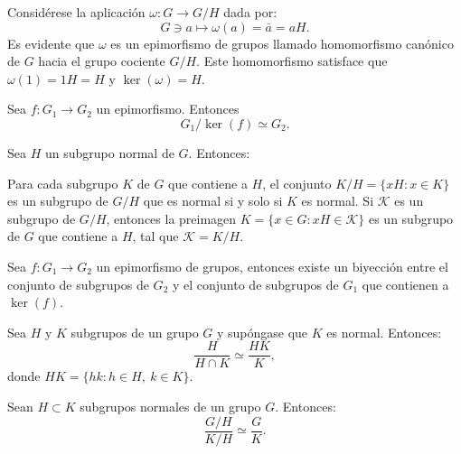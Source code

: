 Considérese la aplicación $\omega \colon G \to G/H$ dada por: \[G \ni a \mapsto \omega(a) = 	\bar{a} = aH. \]
\indent Es evidente que $\omega$ es un epimorfismo de grupos llamado homomorfismo canónico de $G$ hacia el grupo cociente $G/H$. Este homomorfismo satisface que $\omega(1) = 1H = H$ y $\ker(\omega) = H.$ 
\begin{corolario}
Sea $f \colon G_1 \to G_2$ un epimorfismo. Entonces \[ G_1/\ker(f) \simeq G_2. \]
\end{corolario}
\newpage
\begin{lema}
Sea $H$ un subgrupo normal de $G$. Entonces:
\begin{bulletList}
\newItem Para cada subgrupo $K$ de $G$ que contiene a $H$, el conjunto $K/H = \{ xH \colon x \in K \}$ es un subgrupo de $G/H$ que es normal si y solo si $K$ es normal.
\newItem Si $\mathcal{K}$ es un subgrupo de $G/H$, entonces la preimagen $K = \{ x \in G \colon xH \in \mathcal{K} \}$ es un subgrupo de $G$ que contiene a $H$, tal que $\mathcal{K} = K/H$.
\end{bulletList}
\end{lema}
\begin{teorema}
Sea $f \colon G_1 \to G_2$ un epimorfismo de grupos, entonces existe un biyección entre el conjunto de subgrupos de $G_2$ y el conjunto de subgrupos de $G_1$ que contienen a $\ker(f)$.
\end{teorema}
\begin{teorema}
Sea $H$ y $K$ subgrupos de un grupo $G$ y supóngase que $K$ es normal. Entonces: \[ \frac{H}{H \cap K} \simeq \frac{HK}{K}, \] donde $HK = \{ hk \colon h \in H, \ k \in K \}$.
\end{teorema}
\begin{teorema}
Sean $H \subset K$ subgrupos normales de un grupo $G$. Entonces:
\[\frac{G/H}{K/H} \simeq \frac{G}{K}. \]
\end{teorema}
